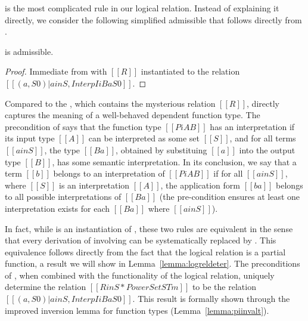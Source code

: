 \documentclass[acmsmall,screen=true,
\ifpublic review=false\else,review=true\fi
  ,anonymous=\ifanonymous true\else false\fi]{acmart}
\begin{document}
 is the most complicated rule in our logical
relation. Instead of explaining it directly, we consider the following
simplified admissible  that follows directly from .
\begin{center}
\end{center}
\begin{lemma}
  \label{lemma:piintroalt}
   is admissible.
\end{lemma}
\begin{proof}
Immediate from  with $[[R]]$ instantiated to the relation $[[{ (a
, S0 ) | a in S , Interp I i B { a } S0 }]]$.
\end{proof}
Compared to the , which contains the mysterious relation
$[[R]]$,  directly captures the meaning of
a well-behaved dependent function type. The precondition of
 says that
the function type $[[Pi A B]]$ has an interpretation if its input
type $[[A]]$ can be
interpreted as some set $[[S]]$, and for all terms $[[a in S]]$, the
type $[[B {a}]]$, obtained by substituing $[[a]]$ into the output type
$[[B]]$, has some semantic interpretation. In its conclusion, we say
that a term $[[b]]$ belongs to an interpretation of $[[Pi A B]]$ if
for all $[[a in S]]$, where $[[S]]$ is an interpretation $[[A]]$, the
application form $[[b a]]$ belongs to all possible interpretations of
$[[B {a}]]$ (the pre-condition ensures at least one interpretation
exists for each $[[B {a}]]$ where $[[a in S]]$).

In fact, while  is an instantiation of ,
these two rules are equivalent in the sense that every derivation of
involving  can be systematically replaced by
. This equivalence follows directly from the fact
that the logical relation is a partial function, a result we will show
in Lemma~\ref{lemma:logreldeter}. The preconditions of ,
when combined with the functionality of the logical relation, uniquely
determine the relation $[[R in S * PowerSet STm]]$ to be the relation
$[[{ (a , S0 ) | a in S , Interp I  i B { a } S0 }]]$. This result is
formally shown through the improved inversion lemma for function types
(Lemma~\ref{lemma:piinvalt}).
\end{document}
